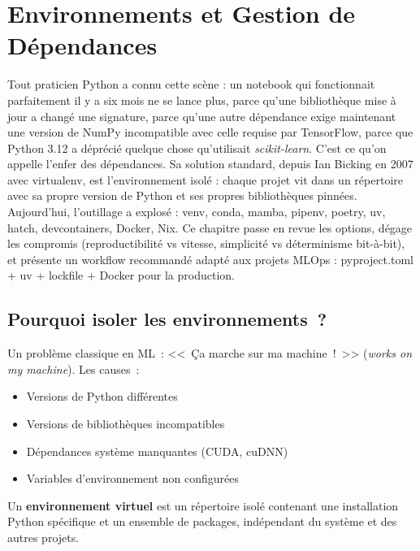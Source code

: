 \chapter{Environnements et Gestion de D\'ependances}
\label{ch:environnements}

Tout praticien Python a connu cette scène : un notebook qui fonctionnait parfaitement il y a six mois ne se lance plus, parce qu'une bibliothèque mise à jour a changé une signature, parce qu'une autre dépendance exige maintenant une version de NumPy incompatible avec celle requise par TensorFlow, parce que Python 3.12 a déprécié quelque chose qu'utilisait \emph{scikit-learn}. C'est ce qu'on appelle l'enfer des dépendances. Sa solution standard, depuis Ian Bicking en 2007 avec virtualenv, est l'environnement isolé : chaque projet vit dans un répertoire avec sa propre version de Python et ses propres bibliothèques pinnées. Aujourd'hui, l'outillage a explosé : venv, conda, mamba, pipenv, poetry, uv, hatch, devcontainers, Docker, Nix. Ce chapitre passe en revue les options, dégage les compromis (reproductibilité vs vitesse, simplicité vs déterminisme bit-à-bit), et présente un workflow recommandé adapté aux projets MLOps : pyproject.toml + uv + lockfile + Docker pour la production.

\section{Pourquoi isoler les environnements~?}
\label{sec:why-envs}

Un probl\`eme classique en ML~: <<~\c{C}a marche sur ma machine~!~>>
(\emph{works on my machine}). Les causes~:
\begin{itemize}
  \item Versions de Python diff\'erentes
  \item Versions de biblioth\`eques incompatibles
  \item D\'ependances syst\`eme manquantes (CUDA, cuDNN)
  \item Variables d'environnement non configur\'ees
\end{itemize}

\begin{definition}
Un \textbf{environnement virtuel} est un
r\'epertoire isol\'e contenant une installation Python sp\'ecifique et un
ensemble de packages, ind\'ependant du syst\`eme et des autres projets.
\end{definition}


